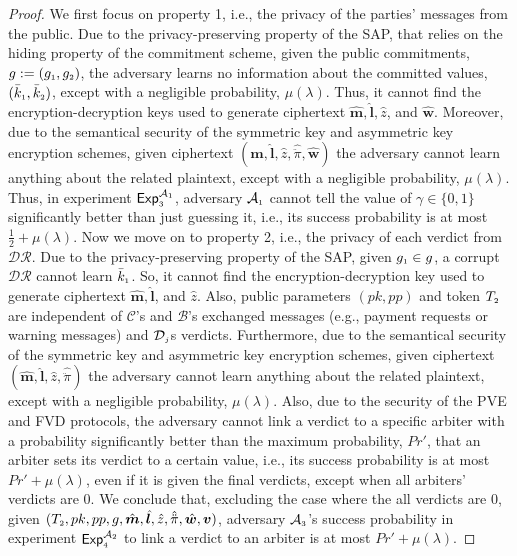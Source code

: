 % 

\begin{proof}
We first focus on property 1, i.e., the privacy of the parties' messages from the public.  Due to the privacy-preserving property of the SAP, that relies  on the hiding property of the commitment scheme, given the public commitments, $g:=(g_{\scriptscriptstyle 1}, g_{\scriptscriptstyle 2})$,  the adversary learns no information about the
committed values, $(\bar k_{\scriptscriptstyle 1}, \bar k_{\scriptscriptstyle 2})$, except with a negligible probability, $\mu(\lambda)$. Thus, it cannot find the encryption-decryption keys used to generate ciphertext  $\hat {\bm m}, \hat{\bm l}, \hat z$, and  $\hat{\bm{w}}$. Moreover, due to the semantical security of the symmetric key and asymmetric key encryption schemes,  given ciphertext $(\hat {\bm m}, \hat{\bm l}, \hat z, \hat{\ddot \pi}, \hat{\bm{w}})$ the adversary cannot learn anything  about the related plaintext, except with a negligible probability, $\mu(\lambda)$. Thus, in experiment  $\mathsf{Exp}_{\scriptscriptstyle 3}^{\mathcal{A}_{\scriptscriptstyle 1}}$,  adversary $\mathcal{A}_{\scriptscriptstyle 1}$ cannot tell the value of $\gamma\in \{0, 1\}$ significantly better than just guessing it, i.e., its success probability is at most $\frac{1}{2}+\mu(\lambda)$. Now we move on to property 2, i.e., the privacy of each verdict from $\mathcal{DR}$. Due to the privacy-preserving property of the SAP, given $g_{\scriptscriptstyle 1}\in g$, a corrupt $\mathcal{DR}$ cannot learn  $\bar k_{\scriptscriptstyle 1}$. So,  it cannot find the encryption-decryption key used to generate ciphertext  $\hat {\bm m}, \hat{\bm l}$, and $\hat z$. Also, public parameters $(pk,pp)$ and token $T_{\scriptscriptstyle 2}$ are independent of $\mathcal{C}$'s and $\mathcal{B}$'s exchanged messages (e.g., payment requests or warning messages)  and $\mathcal{D}_{\scriptscriptstyle j}$s  verdicts. Furthermore, due to  the semantical security of the symmetric key and asymmetric key encryption schemes,  given ciphertext $(\hat {\bm m}, \hat{\bm l}, \hat z, \hat{\ddot \pi})$ the adversary cannot learn anything  about the related plaintext, except with a negligible probability, $\mu(\lambda)$. Also, due to the security of the  PVE and FVD protocols, the adversary cannot link a verdict to a specific arbiter with a probability significantly better than the maximum probability, $Pr'$, that an arbiter sets its verdict to a certain value, i.e., its success probability is at most $Pr'+\mu(\lambda)$, even if it is given the final verdicts, except when all arbiters' verdicts are $0$. We conclude that, excluding the case where the all verdicts are $0$, given $(T_{\scriptscriptstyle 2}, pk, pp, g, \hat{\bm m}, \hat{\bm l},  \hat z, \hat{\ddot \pi}, \hat{\bm{w}}, \bm v)$,   adversary $\mathcal{A}_{\scriptscriptstyle 3}$'s success probability in experiment $\mathsf{Exp}_{\scriptscriptstyle 4}^{\mathcal{A}_{\scriptscriptstyle 2}}$ to link a verdict to an arbiter is at most $Pr'+\mu(\lambda)$. 
%
\end{proof}

